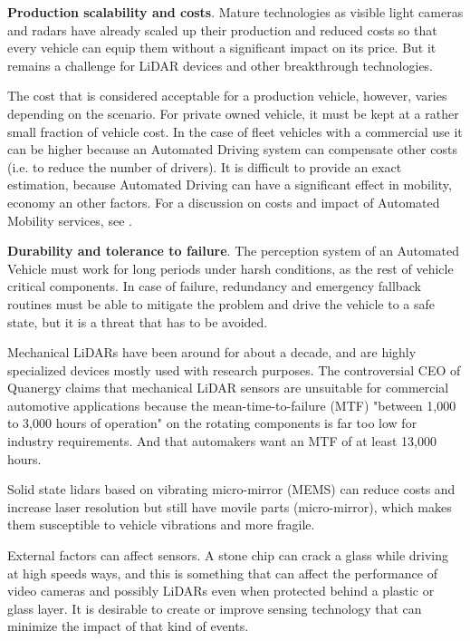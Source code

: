 \textbf{Production scalability and costs}. 
Mature technologies as visible light cameras and radars have already scaled up 
their production and reduced costs so that every vehicle can equip them without
a significant impact on its price. But it remains a challenge for LiDAR devices
and other breakthrough technologies.
 
The cost that is considered acceptable for a production vehicle, however, varies depending on the scenario. For private owned vehicle, it must be kept at a rather small fraction of vehicle cost. In the case of fleet vehicles with a commercial use it can be higher because an Automated Driving system can compensate other costs (i.e. to reduce the number of drivers).
It is difficult to provide an exact estimation, because Automated Driving can have a 
significant effect in mobility, economy an other factors. For a discussion
on costs and impact of Automated Mobility services, see \cite{Bosch2018}.

\textbf{Durability and tolerance to failure}.
The perception system of an Automated Vehicle must work for long
periods under harsh conditions, as the rest of vehicle critical components. 
In case of failure, redundancy and emergency fallback routines must be able to 
mitigate the problem and drive the vehicle to a safe state, but it is a 
threat that has to be avoided.

Mechanical LiDARs have been around for about a decade, and are highly 
specialized devices mostly used with research purposes.
The controversial CEO of Quanergy claims 
\cite{Hampstead2018}
that mechanical LiDAR sensors are unsuitable for commercial 
automotive applications because the mean-time-to-failure (MTF)
"between 1,000 to 3,000 hours of operation" on the rotating 
components is far too low for industry requirements. And that automakers want 
an MTF of at least 13,000 hours.

Solid state lidars based on vibrating micro-mirror (MEMS) can reduce costs and increase laser resolution but 
still have movile parts (micro-mirror), which makes them susceptible to vehicle vibrations and more fragile.

External factors can affect sensors. A stone chip can crack a glass while 
driving at high speeds ways, and this is something that can affect the 
performance of video cameras and possibly LiDARs even when protected behind
a plastic or glass layer. It is desirable to create or improve sensing 
technology that can minimize the impact of that kind of events.

